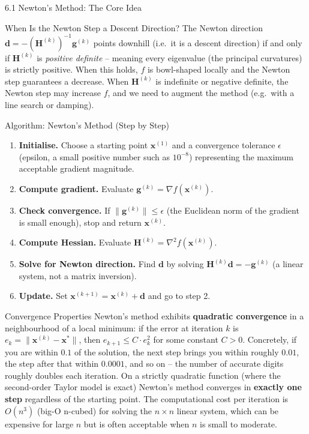 \documentclass[aspectratio=169,10pt]{beamer}
\newcommand{\xbf}{\mathbf{x}}
\newcommand{\gbf}{\mathbf{g}}
\newcommand{\Hbf}{\mathbf{H}}
\begin{document}
\begin{frame}[allowframebreaks]{6.1 Newton's Method: The Core Idea}
  \begin{alertblock}{When Is the Newton Step a Descent Direction?}
    The Newton direction $\mathbf{d} = -(\Hbf^{(k)})^{-1}\gbf^{(k)}$ points
    downhill (i.e.\ it is a descent direction) if and only if $\Hbf^{(k)}$ is
    \emph{positive definite} -- meaning every eigenvalue (the principal
    curvatures) is strictly positive.  When this holds, $f$ is bowl-shaped locally
    and the Newton step guarantees a decrease.  When $\Hbf^{(k)}$ is indefinite or
    negative definite, the Newton step may increase $f$, and we need to augment the
    method (e.g.\ with a line search or damping).
  \end{alertblock}

  \framebreak

  \begin{block}{Algorithm: Newton's Method (Step by Step)}
    \begin{enumerate}
      \item \textbf{Initialise.}  Choose a starting point $\xbf^{(1)}$ and a
        convergence tolerance $\epsilon$ (epsilon, a small positive number such as
        $10^{-8}$) representing the maximum acceptable gradient magnitude.
      \item \textbf{Compute gradient.}  Evaluate $\gbf^{(k)} = \nabla f(\xbf^{(k)})$.
      \item \textbf{Check convergence.}  If $\|\gbf^{(k)}\| \leq \epsilon$ (the
        Euclidean norm of the gradient is small enough), stop and return $\xbf^{(k)}$.
      \item \textbf{Compute Hessian.}  Evaluate $\Hbf^{(k)} = \nabla^2 f(\xbf^{(k)})$.
      \item \textbf{Solve for Newton direction.}  Find $\mathbf{d}$ by solving
        $\Hbf^{(k)}\mathbf{d} = -\gbf^{(k)}$ (a linear system, not a matrix
        inversion).
      \item \textbf{Update.}  Set $\xbf^{(k+1)} = \xbf^{(k)} + \mathbf{d}$ and go
        to step 2.
    \end{enumerate}
  \end{block}

  \begin{block}{Convergence Properties}
    Newton's method exhibits \textbf{quadratic convergence} in a neighbourhood of
    a local minimum: if the error at iteration $k$ is $e_k = \|\xbf^{(k)} -
    \xbf^*\|$, then $e_{k+1} \leq C \cdot e_k^2$ for some constant $C > 0$.
    Concretely, if you are within $0.1$ of the solution, the next step brings you
    within roughly $0.01$, the step after that within $0.0001$, and so on -- the
    number of accurate digits roughly doubles each iteration.  On a strictly
    quadratic function (where the second-order Taylor model is exact) Newton's
    method converges in \textbf{exactly one step} regardless of the starting
    point.  The computational cost per iteration is $O(n^3)$ (big-O n-cubed) for
    solving the $n \times n$ linear system, which can be expensive for large $n$
    but is often acceptable when $n$ is small to moderate.
  \end{block}


\end{frame}
\end{document}
